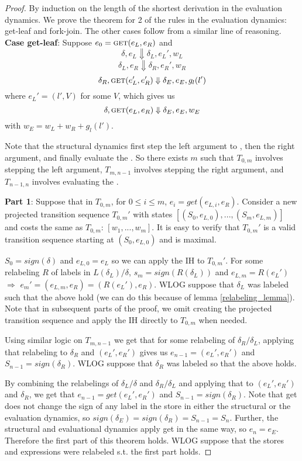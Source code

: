 \begin{proof}
By induction on the length of the shortest derivation in the evaluation dynamics. We prove the theorem for 2 of the rules in the evaluation dynamics: get-leaf and fork-join. The other cases follow from a similar line of reasoning.
\\

\noindent \textbf{Case get-leaf}: Suppose $e_0 = \text{{\sc get}}{}(e_L, e_R)$ and
$$\delta, e_L \Downarrow \delta_L, e_L', w_L$$
$$\delta_L, e_R \Downarrow \delta_R, e_R', w_R$$
$$\delta_R, \text{{\sc get}}{}(e_L', e_R') \Downarrow \delta_E, e_E, g_l(l')$$
where $e_L' = (l', V)$ for some $V$, which gives us
$$\delta, \text{{\sc get}}{}(e_L, e_R) \Downarrow \delta_E, e_E, w_E$$
with $w_E = w_L + w_R + g_l(l')$.

Note that the structural dynamics first step the left argument to \get{}, then the right argument, and finally evaluate the \get{}. So there exists $m$ such that $T_{0,m}$ involves stepping the left argument, $T_{m,n-1}$ involves stepping the right argument, and $T_{n-1,n}$ involves evaluating the \get{}.

\textbf{Part 1}: Suppose that in $T_{0,m}$, for $0 \leq i \leq m$, $e_i = get(e_{L,i}, e_R)$. Consider a new projected transition sequence $T_{0,m}'$ with states $[(S_0, e_{L,0}), ..., (S_m, e_{L,m})]$ and costs the same as $T_{0,m}$: $[w_1, ..., w_m]$. It is easy to verify that $T_{0,m}'$ is a valid transition sequence starting at $(S_0, e_{L,0})$ and is maximal. 

$S_0 = sign(\delta)$ and $e_{L,0} = e_L$ so we can apply the IH to $T_{0,m}'$. For some relabeling $R$ of labels in $L(\delta_L) / \delta$, $s_m = sign(R(\delta_L))$ and $e_{L,m} = R(e_L')$ $\Rightarrow$ $e_m' = (e_{L,m}, e_R) = (R(e_L'), e_R)$. WLOG suppose that $\delta_L$ was labeled such that the above hold (we can do this because of lemma \ref{relabeling_lemma}). Note that in subsequent parts of the proof, we omit creating the projected transition sequence and apply the IH directly to $T_{0,m}$ when needed.

Using similar logic on $T_{m,n-1}$ we get that for some relabeling of $\delta_R / \delta_L$, applying that relabeling to $\delta_R$ and $(e_L', e_R')$ gives us $e_{n-1} = (e_L', e_R')$ and $S_{n-1} = sign(\delta_R)$. WLOG suppose that $\delta_R$ was labeled so that the above holds.

By combining the relabelings of $\delta_L / \delta$ and $\delta_R / \delta_L$ and applying that to $(e_L', e_R')$ and $\delta_R$, we get that $e_{n-1} = get(e_L', e_R')$ and $S_{n-1} = sign(\delta_R)$. Note that get does not change the sign of any label in the store in either the structural or the evaluation dynamics, so $sign(\delta_E) = sign(\delta_R) = S_{n-1} = S_n$. Further, the structural and evaluational dynamics apply get in the same way, so $e_n = e_E$. Therefore the first part of this theorem holds. WLOG suppose that the stores and expressions were relabeled s.t. the first part holds.


\end{proof}

